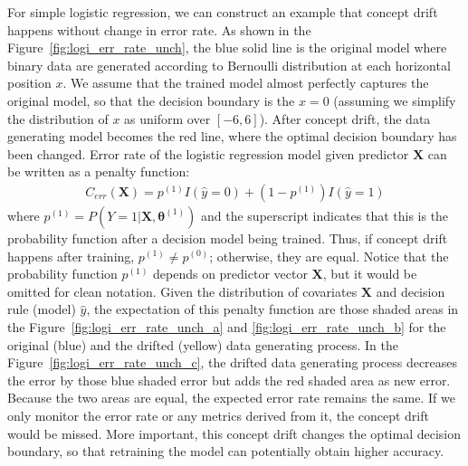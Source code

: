\documentclass[twoside,11pt]{article}
\begin{document}
For simple logistic regression, we can construct an example that concept drift happens without change in error rate. As shown in the Figure~\ref{fig:logi_err_rate_unch}, the blue solid line is the original model where binary data are generated according to Bernoulli distribution at each horizontal position $x$. We assume that the trained model almost perfectly captures the original model, so that the decision boundary is the $x=0$ (assuming we simplify the distribution of $x$ as uniform over $[-6, 6]$). After concept drift, the data generating model becomes the red line, where the optimal decision boundary has been changed. Error rate of the logistic regression model given predictor $\bm {X}$ can be written as a penalty function:
\begin{align}
C _{err}(\bm {X}) = p ^{(1)}I(\hat{y}=0)+(1-p ^{(1)})I(\hat{y}=1)
\label{eqn:penal_err}
\end{align}
where $p ^{(1)} = P(Y=1|\bm {X}, \bm { \theta} ^{(1)})$ and the superscript indicates that this is the probability function after a decision model being trained. Thus, if concept drift happens after training, $p ^{(1)} \neq p ^{(0)}$; otherwise, they are equal. Notice that the probability function $p ^{(1)}$ depends on predictor vector $\bm {X}$, but it would be omitted for clean notation. Given the distribution of covariates $\bm {X}$ and decision rule (model) $\hat{y}$, the expectation of this penalty function are those shaded areas in the Figure~\ref{fig:logi_err_rate_unch_a} and \ref{fig:logi_err_rate_unch_b} for the original (blue) and the drifted (yellow) data generating process. In the Figure~\ref{fig:logi_err_rate_unch_c}, the drifted data generating process decreases the error by those blue shaded error but adds the red shaded area as new error. Because the two areas are equal, the expected error rate remains the same. If we only monitor the error rate or any metrics derived from it, the concept drift would be missed. More important, this concept drift changes the optimal decision boundary, so that retraining the model can potentially obtain higher accuracy. 
\end{document}
